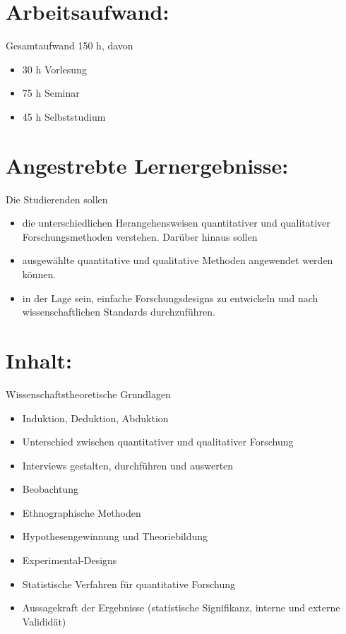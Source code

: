 \section*{Arbeitsaufwand:}\label{arbeitsaufwand-14}

Gesamtaufwand 150 h, davon

\begin{itemize}
\item
  30 h Vorlesung
\item
  75 h Seminar
\item
  45 h Selbststudium
\end{itemize}

\section*{Angestrebte
Lernergebnisse:}\label{angestrebte-lernergebnisse-21}

Die Studierenden sollen

\begin{itemize}
\item
  die unterschiedlichen Herangehensweisen quantitativer und qualitativer
  Forschungsmethoden verstehen. Darüber hinaus sollen
\item
  ausgewählte quantitative und qualitative Methoden angewendet werden
  können.
\item
  in der Lage sein, einfache Forschungsdesigns zu entwickeln und nach
  wissenschaftlichen Standards durchzuführen.
\end{itemize}

\section*{Inhalt:}\label{inhalt-21}

Wissenschaftstheoretische Grundlagen

\begin{itemize}
\item
  Induktion, Deduktion, Abduktion
\item
  Unterschied zwischen quantitativer und qualitativer Forschung
\item
  Interviews gestalten, durchführen und auswerten
\item
  Beobachtung
\item
  Ethnographische Methoden
\item
  Hypothesengewinnung und Theoriebildung
\item
  Experimental-Designs
\item
  Statistische Verfahren für quantitative Forschung
\item
  Aussagekraft der Ergebnisse (statistische Signifikanz, interne und
  externe Valididät)
\end{itemize}

